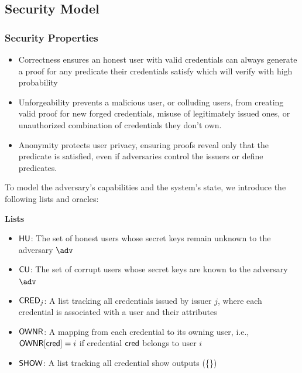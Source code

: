 \newpage
\subsection{Security Model}


\subsubsection{Security Properties}

\begin{itemize}
    \item Correctness ensures an honest user with valid credentials can always generate a proof for any predicate their credentials satisfy which will verify with high probability

    \item Unforgeability prevents a malicious user, or colluding users, from creating valid proof for new forged credentials, misuse of legitimately issued ones, or unauthorized combination of credentials they don't own.

    \item Anonymity protects user privacy, ensuring proofs reveal only that the predicate is satisfied, even if adversaries control the issuers or define predicates. 
\end{itemize}

To model the adversary’s capabilities and the system’s state, we introduce the following lists and oracles:


\noindent\textbf{Lists}
\begin{itemize}
    \item $\mathsf{HU}$: The set of honest users whose secret keys remain unknown to the adversary $\adv$
    \item $\mathsf{CU}$: The set of corrupt users whose secret keys are known to the adversary $\adv$
    \item $\mathsf{CRED}_j$: A list tracking all credentials issued by issuer $j$, where each credential is associated with a user and their attributes
    \item $\mathsf{OWNR}$: A mapping from each credential to its owning user, i.e., $\mathsf{OWNR}[\mathsf{cred}] = i$ if credential $\mathsf{cred}$ belongs to user $i$
    \item $\mathsf{SHOW}$: A list tracking all credential show outputs (\{\})
\end{itemize} 

